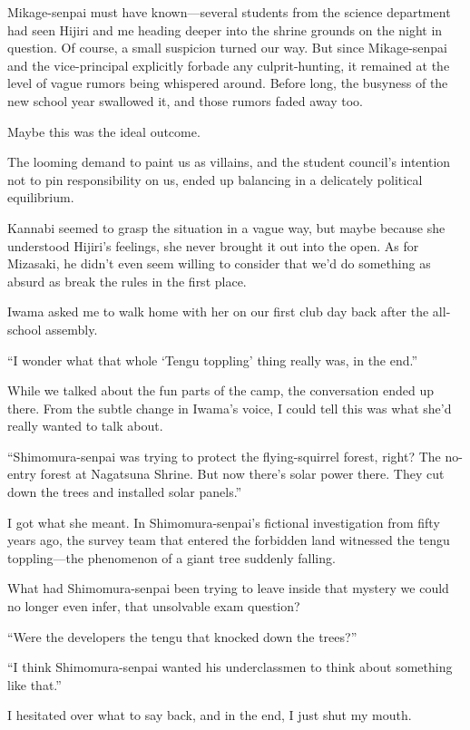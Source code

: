 \documentclass[
    a4paper,
    12pt,
    twoside,
    openany,
    UTF8,
    fontset=windows
]{ctexbook}
\begin{document}
Mikage-senpai must have known---several students from the science department had seen Hijiri and me heading deeper into the shrine grounds on the night in question. Of course, a small suspicion turned our way. But since Mikage-senpai and the vice-principal explicitly forbade any culprit-hunting, it remained at the level of vague rumors being whispered around. Before long, the busyness of the new school year swallowed it, and those rumors faded away too.

Maybe this was the ideal outcome.

The looming demand to paint us as villains, and the student council's intention not to pin responsibility on us, ended up balancing in a delicately political equilibrium.

Kannabi seemed to grasp the situation in a vague way, but maybe because she understood Hijiri's feelings, she never brought it out into the open. As for Mizasaki, he didn't even seem willing to consider that we'd do something as absurd as break the rules in the first place.

Iwama asked me to walk home with her on our first club day back after the all-school assembly.

``I wonder what that whole `Tengu toppling' thing really was, in the end.''

While we talked about the fun parts of the camp, the conversation ended up there. From the subtle change in Iwama's voice, I could tell this was what she'd really wanted to talk about.

``Shimomura-senpai was trying to protect the flying-squirrel forest, right? The no-entry forest at Nagatsuna Shrine. But now there's solar power there. They cut down the trees and installed solar panels.''

I got what she meant. In Shimomura-senpai's fictional investigation from fifty years ago, the survey team that entered the forbidden land witnessed the tengu toppling---the phenomenon of a giant tree suddenly falling.

What had Shimomura-senpai been trying to leave inside that mystery we could no longer even infer, that unsolvable exam question?

``Were the developers the tengu that knocked down the trees?''

``I think Shimomura-senpai wanted his underclassmen to think about something like that.''

I hesitated over what to say back, and in the end, I just shut my mouth.
\end{document}
